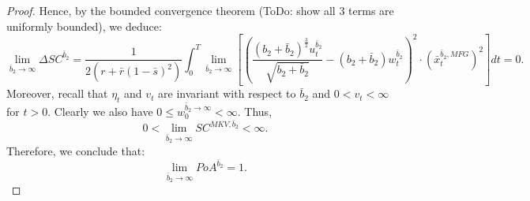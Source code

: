 \documentclass[11pt]{article}
\begin{document}
\begin{proof}
	Hence, by the bounded convergence theorem (ToDo: show all 3 terms are uniformly bounded), we deduce:
	$$ \lim_{\bar{b}_2 \to \infty} \Delta SC^{\bar{b}_2} =  \frac{1}{2(r+ \bar{r}(1-\bar{s})^2)} \int_0^T \lim_{\bar{b}_2 \to \infty}\left[ \left( \frac{ (b_2 + \bar{b}_2)^{\frac{3}{2}} u^{\bar{b}_2}_t }{\sqrt{b_2 + \bar{b}_2}} - (b_2 + \bar{b}_2)w^{\bar{b}_2}_t \right)^2 \cdot \left(\bar{x}_t^{\bar{b}_2,MFG} \right)^2\right] dt = 0.$$	
	Moreover, recall that $\eta_t$ and $v_t$ are invariant with respect to $\bar{b}_2$ and $0<v_t<\infty$ for $t>0$. Clearly we also have $0 \leq w^{\bar{b}_2 \to \infty}_0 < \infty$. Thus,
	$$0< \lim_{\bar{b}_2 \to \infty} SC^{MKV,\bar{b}_2} <\infty.$$
	Therefore, we conclude that:
	$$ \lim_{\bar{b}_2 \to \infty} PoA^{\bar{b}_2} = 1.$$
\end{proof}
\end{document}
